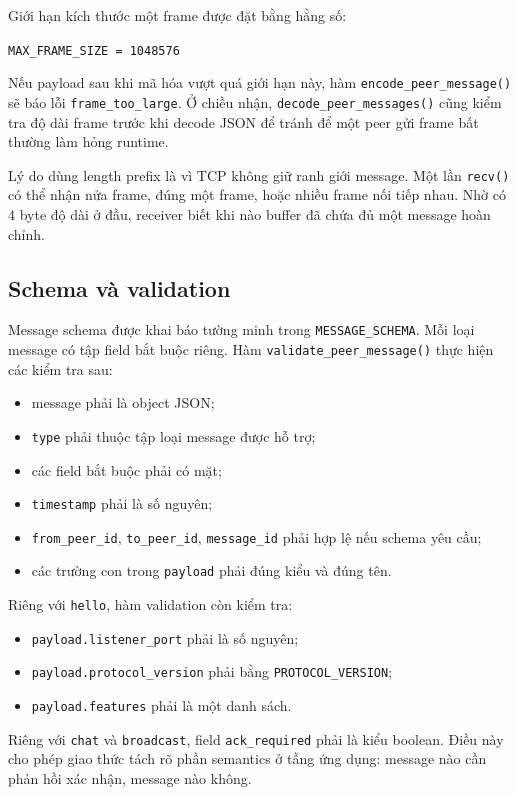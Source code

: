Giới hạn kích thước một frame được đặt bằng hằng số:
\begin{center}
\texttt{MAX\_FRAME\_SIZE = 1048576}
\end{center}

Nếu payload sau khi mã hóa vượt quá giới hạn này, hàm \texttt{encode\_peer\_message()} sẽ báo lỗi \texttt{frame\_too\_large}. Ở chiều nhận, \texttt{decode\_peer\_messages()} cũng kiểm tra độ dài frame trước khi decode JSON để tránh để một peer gửi frame bất thường làm hỏng runtime.

Lý do dùng length prefix là vì TCP không giữ ranh giới message. Một lần \texttt{recv()} có thể nhận nửa frame, đúng một frame, hoặc nhiều frame nối tiếp nhau. Nhờ có 4 byte độ dài ở đầu, receiver biết khi nào buffer đã chứa đủ một message hoàn chỉnh.

\subsection{Schema và validation}
Message schema được khai báo tường minh trong \texttt{MESSAGE\_SCHEMA}. Mỗi loại message có tập field bắt buộc riêng. Hàm \texttt{validate\_peer\_message()} thực hiện các kiểm tra sau:
\begin{itemize}[leftmargin=2em]
    \item message phải là object JSON;
    \item \texttt{type} phải thuộc tập loại message được hỗ trợ;
    \item các field bắt buộc phải có mặt;
    \item \texttt{timestamp} phải là số nguyên;
    \item \texttt{from\_peer\_id}, \texttt{to\_peer\_id}, \texttt{message\_id} phải hợp lệ nếu schema yêu cầu;
    \item các trường con trong \texttt{payload} phải đúng kiểu và đúng tên.
\end{itemize}

Riêng với \texttt{hello}, hàm validation còn kiểm tra:
\begin{itemize}[leftmargin=2em]
    \item \texttt{payload.listener\_port} phải là số nguyên;
    \item \texttt{payload.protocol\_version} phải bằng \texttt{PROTOCOL\_VERSION};
    \item \texttt{payload.features} phải là một danh sách.
\end{itemize}

Riêng với \texttt{chat} và \texttt{broadcast}, field \texttt{ack\_required} phải là kiểu boolean. Điều này cho phép giao thức tách rõ phần semantics ở tầng ứng dụng: message nào cần phản hồi xác nhận, message nào không.

